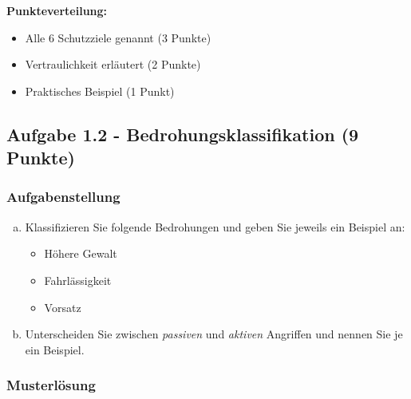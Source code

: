 \documentclass[12pt,a4paper]{article}
\begin{document}
\textbf{Punkteverteilung:}
\begin{itemize}
    \item Alle 6 Schutzziele genannt (3 Punkte) \checkmark
    \item Vertraulichkeit erläutert (2 Punkte) \checkmark
    \item Praktisches Beispiel (1 Punkt) \checkmark
\end{itemize}

\subsection{Aufgabe 1.2 - Bedrohungsklassifikation (9 Punkte)}

\subsubsection*{Aufgabenstellung}

\begin{enumerate}[(a)]
    \item Klassifizieren Sie folgende Bedrohungen und geben Sie jeweils ein Beispiel an:
    \begin{itemize}
        \item Höhere Gewalt
        \item Fahrlässigkeit
        \item Vorsatz
    \end{itemize}
    
    \item Unterscheiden Sie zwischen \textit{passiven} und \textit{aktiven} Angriffen und nennen Sie je ein Beispiel.
\end{enumerate}

\subsubsection*{Musterlösung}
\end{document}
